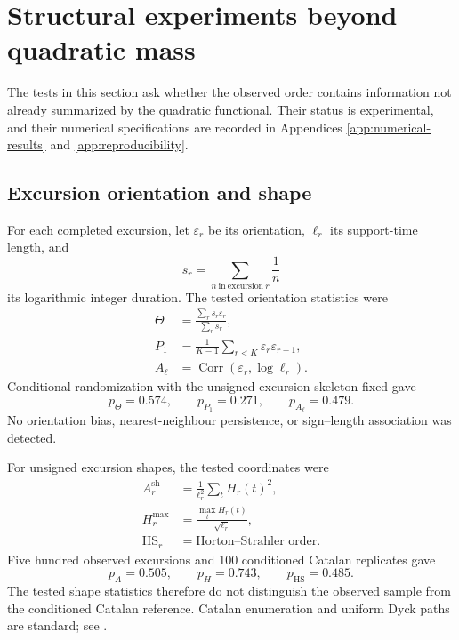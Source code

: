 \documentclass[11pt,reqno]{amsart}
\numberwithin{equation}{section}
\theoremstyle{plain}
\theoremstyle{definition}
\theoremstyle{remark}
\newcommand{\Corr}{\operatorname{Corr}}
\begin{document}
\section{Structural experiments beyond quadratic mass}
\label{sec:structural-experiments}

The tests in this section ask whether the observed order contains information
not already summarized by the quadratic functional.  Their status is
experimental, and their numerical specifications are recorded in Appendices
\ref{app:numerical-results} and \ref{app:reproducibility}.

\subsection{Excursion orientation and shape}
\label{subsec:orientation-shape-tests}

For each completed excursion, let \(\varepsilon_r\) be its orientation,
\(\ell_r\) its support-time length, and
\begin{equation}
s_r=\sum_{n\ \mathrm{in\ excursion}\ r}\frac1n
\label{eq:excursion-log-duration}
\end{equation}
its logarithmic integer duration.  The tested orientation statistics were
\begin{align}
\Theta&=\frac{\sum_rs_r\varepsilon_r}{\sum_rs_r},
\label{eq:orientation-bias-statistic}\\
P_1&=\frac1{K-1}\sum_{r<K}\varepsilon_r\varepsilon_{r+1},
\label{eq:orientation-persistence-statistic}\\
A_{\ell}&=\Corr(\varepsilon_r,\log\ell_r).
\label{eq:orientation-length-statistic}
\end{align}
Conditional randomization with the unsigned excursion skeleton fixed gave
\begin{equation}
p_{\Theta}=0.574,\qquad
p_{P_1}=0.271,\qquad
p_{A_{\ell}}=0.479.
\label{eq:orientation-test-results}
\end{equation}
No orientation bias, nearest-neighbour persistence, or sign--length
association was detected.

For unsigned excursion shapes, the tested coordinates were
\begin{align}
A_r^{\mathrm{sh}}
&=\frac1{\ell_r^2}\sum_tH_r(t)^2,
\label{eq:shape-area-statistic}\\
H_r^{\max}
&=\frac{\max_tH_r(t)}{\sqrt{\ell_r}},
\label{eq:shape-height-statistic}\\
\operatorname{HS}_r
&=\text{Horton--Strahler order}.
\label{eq:shape-tree-statistic}
\end{align}
Five hundred observed excursions and 100 conditioned Catalan replicates gave
\begin{equation}
p_A=0.505,\qquad p_H=0.743,\qquad p_{\mathrm{HS}}=0.485.
\label{eq:catalan-shape-results}
\end{equation}
The tested shape statistics therefore do not distinguish the observed sample
from the conditioned Catalan reference.  Catalan enumeration and uniform
Dyck paths are standard; see \cite{Stanley1999,FlajoletSedgewick2009}.
\end{document}
